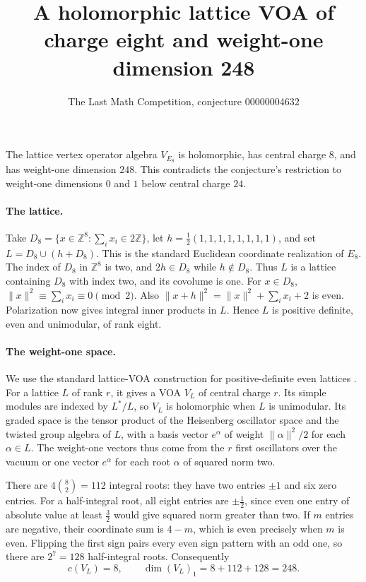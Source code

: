 \documentclass[11pt]{article}
\title{A holomorphic lattice VOA of charge eight and weight-one dimension 248}
\author{The Last Math Competition, conjecture 00000004632}
\date{}
\begin{document}
\maketitle

The lattice vertex operator algebra \(V_{E_8}\) is holomorphic, has central
charge \(8\), and has weight-one dimension \(248\). This contradicts the
conjecture's restriction to weight-one dimensions \(0\) and \(1\) below
central charge \(24\).

\paragraph{The lattice.}
Take \(D_8=\{x\in\mathbb Z^8:\sum_i x_i\in2\mathbb Z\}\), let
\(h=\tfrac12(1,1,1,1,1,1,1,1)\), and set \(L=D_8\cup(h+D_8)\).
This is the standard Euclidean coordinate realization of \(E_8\).
The index of \(D_8\) in \(\mathbb Z^8\) is two, and \(2h\in D_8\) while
\(h\notin D_8\). Thus \(L\) is a lattice containing \(D_8\) with index two,
and its covolume is one. For \(x\in D_8\),
\(\|x\|^2\equiv\sum_i x_i\equiv0\pmod{2}\). Also
\(\|x+h\|^2=\|x\|^2+\sum_i x_i+2\) is even. Polarization now gives integral
inner products in \(L\). Hence \(L\) is positive definite, even and
unimodular, of rank eight.

\paragraph{The weight-one space.}
We use the standard lattice-VOA construction for positive-definite even
lattices \cite{dongmason}. For a lattice \(L\) of rank \(r\), it gives a VOA
\(V_L\) of central charge \(r\). Its simple modules are indexed by
\(L^*/L\), so \(V_L\) is holomorphic when \(L\) is unimodular. Its graded
space is the tensor product of the Heisenberg oscillator space and the
twisted group algebra of \(L\), with a basis vector \(e^\alpha\) of weight
\(\|\alpha\|^2/2\) for each \(\alpha\in L\). The weight-one vectors thus come
from the \(r\) first oscillators over the vacuum or one vector \(e^\alpha\)
for each root \(\alpha\) of squared norm two.

There are \(4\binom82=112\) integral roots: they have two entries \(\pm1\)
and six zero entries. For a half-integral root, all eight entries are
\(\pm\tfrac12\), since even one entry of absolute value at least
\(\tfrac32\) would give squared norm greater than two. If \(m\) entries are
negative, their coordinate sum is \(4-m\), which is even precisely when
\(m\) is even. Flipping the first sign pairs every even sign pattern with
an odd one, so there are \(2^7=128\) half-integral roots. Consequently
\[
 c(V_L)=8,\qquad \dim (V_L)_1=8+112+128=248.
\]
\end{document}
